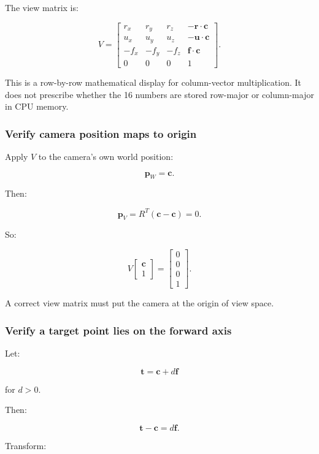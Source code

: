 The view matrix is:

\[
 \boxed{ V= \begin{bmatrix} r_x&r_y&r_z&-\mathbf r\cdot\mathbf c\\ u_x&u_y&u_z&-\mathbf u\cdot\mathbf c\\ -f_x&-f_y&-f_z&\mathbf f\cdot\mathbf c\\ 0&0&0&1 \end{bmatrix} }.
\]

This is a row-by-row mathematical display for column-vector multiplication. It does not prescribe whether the 16 numbers are stored row-major or column-major in CPU memory.

\subsubsection{Verify camera position maps to origin}\label{02-foundations-ii-ch032-verify-camera-position-maps-to-origin}

Apply \(V\) to the camera's own world position:

\[
 \mathbf p_W=\mathbf c.
\]

Then:

\[
 \mathbf p_V=R^T(\mathbf c-\mathbf c)=0.
\]

So:

\[
 \boxed{ V\begin{bmatrix}\mathbf c\\1\end{bmatrix} = \begin{bmatrix}0\\0\\0\\1\end{bmatrix} }.
\]

A correct view matrix must put the camera at the origin of view space.

\subsubsection{Verify a target point lies on the forward axis}\label{02-foundations-ii-ch032-verify-a-target-point-lies-on-the-forward-axis}

Let:

\[
 \mathbf t=\mathbf c+d\mathbf f
\]

for \(d>0\).

Then:

\[
 \mathbf t-\mathbf c=d\mathbf f.
\]

Transform:

